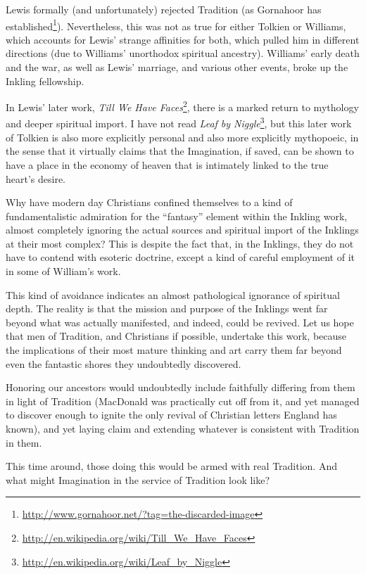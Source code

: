 Lewis formally (and unfortunately) rejected Tradition (as Gornahoor has established\footnote{\url{http://www.gornahoor.net/?tag=the-discarded-image}}). Nevertheless, this was not as true for either Tolkien or Williams, which accounts for Lewis' strange affinities for both, which pulled him in different directions (due to Williams' unorthodox spiritual ancestry). Williams' early death and the war, as well as Lewis' marriage, and various other events, broke up the Inkling fellowship.

In Lewis' later work, \emph{Till We Have Faces}\footnote{\url{http://en.wikipedia.org/wiki/Till_We_Have_Faces}}, there is a marked return to mythology and deeper spiritual import. I have not read
\emph{Leaf by Niggle}\footnote{\url{http://en.wikipedia.org/wiki/Leaf_by_Niggle}}, but this later work of Tolkien is also more explicitly personal and also more explicitly mythopoeic, in the sense that it virtually claims that the Imagination, if saved, can be shown to have a place in the economy of heaven that is intimately linked to the true heart's desire.

Why have modern day Christians confined themselves to a kind of fundamentalistic admiration for the ``fantasy'' element within the Inkling work, almost completely ignoring the actual sources and spiritual import of the Inklings at their most complex? This is despite the fact that, in the Inklings, they do not have to contend with esoteric doctrine, except a kind of careful employment of it in some of William's work.

This kind of avoidance indicates an almost pathological ignorance of spiritual depth. The reality is that the mission and purpose of the Inklings went far beyond what was actually manifested, and indeed, could be revived. Let us hope that men of Tradition, and Christians if possible, undertake this work, because the implications of their most mature thinking and art carry them far beyond even the fantastic shores they undoubtedly discovered.

Honoring our ancestors would undoubtedly include faithfully differing from them in light of Tradition (MacDonald was practically cut off from it, and yet managed to discover enough to ignite the only revival of Christian letters England has known), and yet laying claim and extending whatever is consistent with Tradition in them.

This time around, those doing this would be armed with real Tradition. And what might Imagination in the service of Tradition look like?

